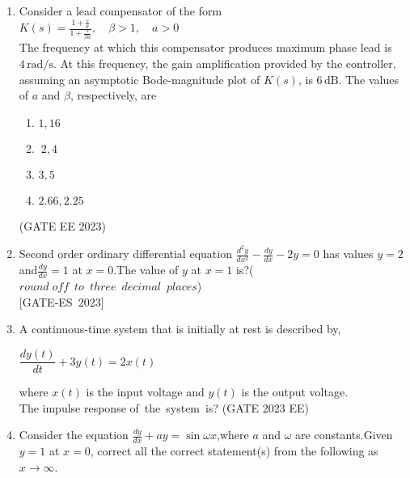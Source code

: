\begin{enumerate}[label=\thechapter.\arabic*,ref=\thechapter.\theenumi]
\hfill(GATE AE 54 2023)\\
\solution

\pagebreak

\item Consider a lead compensator of the form \\
$K(s) = \frac{1 + \frac{s}{a}}{1 + \frac{s}{\beta a}}, \quad \beta > 1, \quad a > 0$\\
The frequency at which this compensator produces maximum phase lead is \(4 \, \text{rad/s}\). At this frequency, the gain amplification provided by the controller, assuming an asymptotic Bode-magnitude plot of \(K(s)\), is \(6 \, \text{dB}\). The values of \(a\) and \(\beta\), respectively, are
\begin{enumerate}
    \item $ 1, 16 $\\
    \item $\ 2, 4 $\\
    \item $ 3, 5 $\\
    \item $ 2.66, 2.25$\\
\end{enumerate}\hfill{(GATE EE 2023)}
\solution

\newpage

\item Second order ordinary differential equation $\frac{d^2y}{dx^2}-\frac{dy}{dx}-2y=0$ has values 
$y=2$ and$\frac{dy}{dx}=1$ at $x=0$.The value of $y$ at $x=1$ is?($round\; off\;\: to\;\: three\;\: decimal\;\: places$)
 \\ \hfill[GATE-ES 2023]\\
 \solution
  
 \newpage

 \item A continuous-time system that is initially at rest is described by,	
	\begin{center}
		$\dfrac{dy(t)}{dt} + 3y(t) = 2x(t)$
	\end{center}
where $x(t)$ is the input voltage and $y(t)$ is the output voltage.\\ 
The impulse response of the system is?
\hfill(GATE 2023 EE)
\solution
\newpage

\item Consider the equation $\frac{dy}{dx}+ay=\sin{\omega x}$,where $a$ and $\omega$ are constants.Given $y=1$ at $x=0$, correct all the correct statement(s) from the following as $x\to \infty$.
\begin{enumerate}


\end{enumerate}
\end{enumerate}
